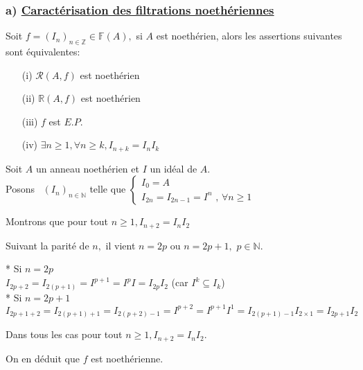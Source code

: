 \subsubsection{a) \underline{Caractérisation des filtrations noethériennes}} 
\begin{maproposition}
	Soit $f=(I_{n})_{n \in \mathbb{Z}}\in \mathbb{F}(A),$ si $A$ est noethérien, alors les assertions suivantes sont équivalentes:
	\begin{enumerate}
		\item[(i)] $\mathcal{R}(A,f)$ est noethérien
		\item[(ii)] $\mathbb{R}(A,f)$ est noethérien
		\item[(iii)] $f$ est $E.P.$
		\item[(iv)] $\exists n \geqslant 1,\forall n \geqslant k, I_{n+k} = I_nI_k$
	\end{enumerate}
\end{maproposition}
\begin{monexemple}
	Soit $A$ un anneau noethérien et $I$ un idéal de $A$.\\
	Posons \ $(I_{n})_{n\in \mathbb{N}}$ telle que $\left\{ 
	\begin{array}{c}
		I_{0}=A \\ 
		I_{2n}=I_{2n-1}=I^{n}\text{ , }\forall n\geq 1
	\end{array}
	\right. $
	
	Montrons que pour tout $n\geq 1,I_{n+2}=I_{n}I_{2}$
	
	Suivant la parité de $n,$ il vient $n=2p$ ou $n=2p+1,$ $p\in \mathbb{N}.$
	
	* Si $n=2p$ \\
	$I_{2p+2}=I_{2(p+1)}=I^{p+1}=I^{p}I=I_{2p}I_{2}$ (car $I^{k}\subseteq I_{k}$) \\
	* Si $n=2p+1$ \\
	$I_{2p+1+2}=I_{2(p+1)+1}=I_{2(p+2)-1}=I^{p+2}=I^{p+1}I^{1}=I_{2(p+1)-1}I_{2\times 1}=I_{2p+1}I_{2}$
	
	Dans tous les cas pour tout $n\geq 1,I_{n+2}=I_{n}I_{2}.$
	
	On en déduit que $f$ est noethérienne.
\end{monexemple}

